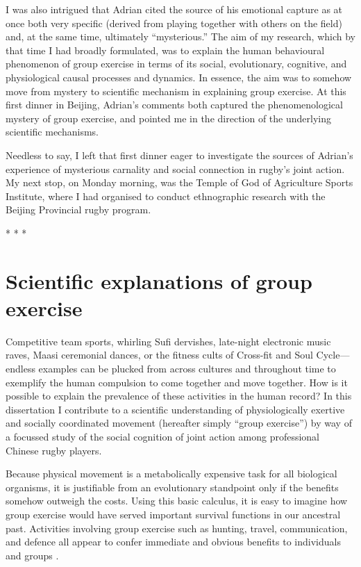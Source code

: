 \begin{CJK}{UTF8}{gbsn}
I was also intrigued that Adrian cited the source of his emotional capture as at once both very specific (derived from playing together with others on the field) and, at the same time, ultimately ``mysterious.''  The aim of my research, which by that time I had broadly formulated, was to explain the human behavioural phenomenon of group exercise in terms of its social, evolutionary, cognitive, and physiological causal processes and dynamics.  In essence, the aim was to somehow move from mystery to scientific mechanism in explaining group exercise.  At this first dinner in Beijing, Adrian's comments both captured the phenomenological mystery of group exercise, and pointed me in the direction of the underlying scientific mechanisms.

Needless to say, I left that first dinner eager to investigate the sources of Adrian's experience of mysterious carnality and social connection in rugby's joint action.  My next stop, on Monday morning, was the Temple of God of Agriculture Sports Institute, where I had organised to conduct ethnographic research with the Beijing Provincial rugby program.


                            \begin{center}
                              * * *
                            \end{center}





\section{Scientific explanations of group exercise}
Competitive team sports, whirling Sufi dervishes, late-night electronic music raves, Maasi ceremonial dances, or the fitness cults of Cross-fit and Soul Cycle---endless examples can be plucked from across cultures and throughout time to exemplify the human compulsion to come together and move together.  How is it possible to explain the prevalence of these activities in the human record?  In this dissertation I contribute to a scientific understanding of physiologically exertive and socially coordinated movement (hereafter simply ``group exercise'') by way of a focussed study of the social cognition of joint action among professional Chinese rugby players.

Because physical movement is a metabolically expensive task for all biological organisms, it is justifiable from an evolutionary standpoint only if the benefits somehow outweigh the costs.  Using this basic calculus, it is easy to imagine how group exercise would have served important survival functions in our ancestral past.  Activities involving group exercise such as hunting, travel, communication, and defence all appear to confer immediate and obvious benefits to individuals and groups \citep{Sands2010}.


\end{CJK}
